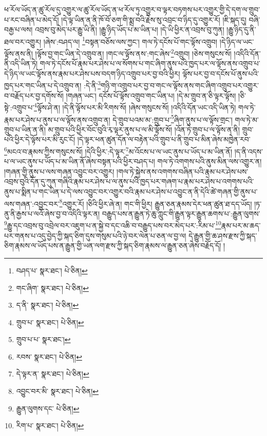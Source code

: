 ཕ་རོལ་ཡོད་ན་ཚུ་རོལ་དུ་འགྱུར་ལ་ཚུ་རོལ་ཡོད་ན་ཕ་རོལ་ཏུ་འགྱུར་བ་ལྟར་བཏགས་པར་འགྱུར་གྱི་དེ་དག་ལ་གྲུབ་པ་རང་བཞིན་པ་མེད་དོ། །དེ་ལྟ་ཡིན་ན་ནི་ཁོ་བོ་ཅག་གི་སྨྲ་བའི་རྗེས་སུ་འབྲང་བ་ཉིད་དུ་འགྱུར་རོ། །ཇི་སྐད་དུ། བཞི་བརྒྱ་པ་ལས། འབྲས་བུ་མེད་པར་རྒྱུ་ཡི་ནི། །རྒྱུ་ཉིད་ཡོད་པ་མ་ཡིན་པ། །དེ་ཡི་ཕྱིར་ན་འབྲས་བུ་ཀུན། །རྒྱུ་ཉིད་དུ་ནི་ཐལ་བར་འགྱུར། །ཞེས་:བཤད་ལ། \footnote{བཤད་པ་  སྣར་ཐང་།  པེ་ཅིན། }བསྟན་བཅོས་ལས་ཀྱང་། གལ་ཏེ་དངོས་པོ་གང་ལྟོས་འགྲུབ། །དེ་ཉིད་ལ་ཡང་ལྟོས་ནས་ནི། །ལྟོས་བྱ་གང་ཡིན་དེ་འགྲུབ་ན། །གང་ལ་ལྟོས་ནས་:གང་ཞེས་\footnote{གང་ཞིག་  སྣར་ཐང་།  པེ་ཅིན། }འགྲུབ། །ཅེས་གསུངས་སོ། །འདིའི་དོན་ནི་འདི་ཡིན་ཏེ། གལ་ཏེ་དངོས་པོ་རྣམ་པར་ཤེས་པ་ལ་སོགས་པ་གང་ཞིག་ནུས་པའི་ཁྱད་པར་ལ་ལྟོས་ནས་འགྲུབ་པ་དེ་ཉིད་ལ་ཡང་ལྟོས་ནས་རྣམ་པར་ཤེས་པས་བདག་ཉིད་འགྲུབ་པར་བྱ་བའི་ཕྱིར། ལྟོས་པར་བྱ་བ་དངོས་པོ་ནུས་པའི་ཁྱད་པར་གང་ཡིན་པ་དེ་འགྲུབ་ན། :དེ་ནི་\footnote{ད་ནི་  སྣར་ཐང་།  པེ་ཅིན། }གཉི་ག་འགྲུབ་པར་བྱ་བ་གང་ལ་ལྟོས་ནས་གང་ཞིག་འགྲུབ་པར་འགྱུར་བ་བརྗོད་པར་བྱ་དགོས་སོ། །གཞན་ཡང་། དངོས་པོ་ལྟོས་འགྲུབ་གང་ཡིན་པ། །དེ་མ་གྲུབ་ན་ཅི་ལྟར་ལྟོས། །ཅི་སྟེ་:འགྲུབ་པ་\footnote{གྲུབ་པ་  སྣར་ཐང་།  པེ་ཅིན། }ལྟོས་ཤེ་ན། །དེ་ནི་ལྟོས་པར་མི་རིགས་སོ། །ཞེས་གསུངས་སོ། །འདིའི་དོན་ཡང་འདི་ཡིན་ཏེ། གལ་ཏེ་རྣམ་པར་ཤེས་པ་ནུས་པ་ལ་ལྟོས་ནས་འགྲུབ་ན། དེ་གྲུབ་པའམ་མ་:གྲུབ་པ་\footnote{གྲུབ་པ་པ་  སྣར་ཐང་། }ཞིག་ནུས་པ་ལ་ལྟོས་གྲང་། གལ་ཏེ་མ་གྲུབ་པ་ཡིན་ན་ནི། མ་གྲུབ་པའི་ཕྱིར་བོང་བུའི་རྭ་ལྟར་ནུས་པ་ལ་མི་ལྟོས་སོ། །འོན་ཏེ་གྲུབ་པ་ལ་ལྟོས་ན་ནི། གྲུབ་པའི་ཕྱིར་དེ་ལྟོས་པར་མི་རུང་ངོ། །དེ་ལྟར་ཕན་ཚུན་དོན་ལ་བརྟེན་པའི་གྲུབ་པ་ནི་གྲུབ་པ་མིན་ཞེས་མཁྱེན་རབ་\footnote{རབས་  སྣར་ཐང་།  པེ་ཅིན། }མངའ་བ་རྣམས་ཀྱིས་གསུངས་སོ། །དེའི་ཕྱིར་:དེ་ལྟར་\footnote{དེ་ལྟར་ན་  སྣར་ཐང་།  པེ་ཅིན། }མ་འོངས་པ་ལ་ཡང་ནུས་པ་ཡོད་པ་མ་ཡིན་ནོ། །ད་ནི་འདས་པ་ལ་ཡང་ནུས་པ་ཡོད་པ་མ་ཡིན་ནོ་ཞེས་བསྟན་པའི་ཕྱིར་བཤད་པ། གལ་ཏེ་འགགས་པའི་ནུས་མིན་ལས་འགྱུར་ན། །གཞན་གྱི་ནུས་པ་ལས་གཞན་འབྱུང་བར་འགྱུར། །གལ་ཏེ་སྐྱེས་ནས་འགགས་བཞིན་པའི་རྣམ་པར་ཤེས་པས་འབྲས་བུའི་དོན་དུ་ཀུན་གཞིའི་རྣམ་པར་ཤེས་པ་ལ་ནུས་པའི་ཁྱད་པར་གཞག་པ་རྣམ་པར་ཤེས་པ་འགགས་པའི་ནུས་པ་སྨིན་པ་གང་ཡིན་པ་དེ་ལས་འབྱུང་བར་འགྱུར་བའི་རྣམ་པར་ཤེས་པ་འབྱུང་ན་ནི་དེའི་ཚེ་གཞན་གྱི་ནུས་པ་ལས་གཞན་:འབྱུང་བར་\footnote{འབྱུང་བར་མི་  སྣར་ཐང་།  པེ་ཅིན། }འགྱུར་རོ། །ཅིའི་ཕྱིར་ཞེ་ན། གང་གི་ཕྱིར། རྒྱུན་ཅན་རྣམས་དེར་ཕན་ཚུན་ཐ་དད་ཡོད། །ཏ་ནུ་ནི་རྒྱས་པ་ལའོ་ཞེས་བྱ་བ་འདིའི་ལྟར་ན། བརྒྱུད་པས་ན་རྒྱུན་ཏེ་ཆུ་ཀླུང་གི་རྒྱུན་ལྟར་རྒྱུན་ཆགས་པ་:རྒྱུན་ལུགས་\footnote{རྒྱུན་ལུགས་དང་  པེ་ཅིན། }རྒྱུ་དང་འབྲས་བུ་འབྲེལ་བར་འཇུག་པ་ན་སྐྱེ་བ་དང་འཆི་བ་བརྒྱུད་པས་བར་མེད་པར་:རིམ་པ་\footnote{རིག་པ་  སྣར་ཐང་།  པེ་ཅིན། }རྣམ་པར་མ་ཆད་པར་གནས་པ་འདུ་བྱེད་ཀྱི་སྐད་ཅིག་དུས་གསུམ་པའི་ཉེ་བར་ལེན་པ་ཅན་ལ་བྱ་ལ། དེ་རྒྱུན་གྱི་ཆ་ཤས་རྫས་ཀྱི་སྐད་ཅིག་རྣམས་ལ་ཡོད་པས་ན་རྒྱུན་གྱི་ཡན་ལག་རྫས་ཀྱི་སྐད་ཅིག་རྣམས་ལ་རྒྱུན་ཅན་ཞེས་བརྗོད་དོ། །
